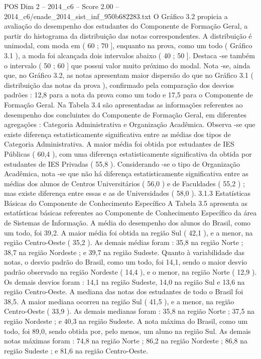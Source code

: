 \begin{textsample}{POS Dim 2 – 2014\_c6 – Score 2.00 – 2014\_c6/enade\_2014\_sist\_inf\_950b682283.txt}
O Gráfico 3.2 propicia a avaliação do desempenho dos estudantes do Componente de Formação Geral, a partir do histograma da distribuição das notas correspondentes.
A distribuição é unimodal, com moda em ( 60 ; 70 ], enquanto na prova, como um todo ( Gráfico 3.1 ), a moda foi alcançada dois intervalos abaixo ( 40 ; 50 ].
Destaca -se também o intervalo ( 50 ; 60 ] que possui valor muito próximo do modal.
Nota -se, ainda que, no Gráfico 3.2, as notas apresentam maior dispersão do que no Gráfico 3.1 ( distribuição das notas da prova ), confirmado pela comparação dos desvios padrões : 12,8 para a nota da prova como um todo e 17,5 para o Componente de Formação Geral.
Na Tabela 3.4 são apresentadas as informações referentes ao desempenho dos concluintes do Componente de Formação Geral, em diferentes agregações : Categoria Administrativa e Organização Acadêmica.
Observa -se que existe diferença estatisticamente significativa entre as médias dos tipos de Categoria Administrativa.
A maior média foi obtida por estudantes de IES Públicas ( 60,4 ), com uma diferença estatisticamente significativa da obtida por estudantes de IES Privadas ( 55,8 ).
Considerando -se o tipo de Organização Acadêmica, nota -se que não há diferença estatisticamente significativa entre as médias dos alunos de Centros Universitários ( 56,0 ) e de Faculdades ( 55,2 ) ; mas existe diferença entre essas e as de Universidades ( 58,0 ). 3.1.3 Estatísticas Básicas do Componente de Conhecimento Específico A Tabela 3.5 apresenta as estatísticas básicas referentes ao Componente de Conhecimento Específico da área de Sistemas de Informação.
A média do desempenho dos alunos do Brasil, como um todo, foi 39,2.
A maior média foi obtida na região Sul ( 42,1 ), e a menor, na região Centro-Oeste ( 35,2 ).
As demais médias foram : 35,8 na região Norte ; 38,7 na região Nordeste ; e 39,7 na região Sudeste.
Quanto à variabilidade das notas, o desvio padrão do Brasil, como um todo, foi 14,1, sendo o maior desvio padrão observado na região Nordeste ( 14,4 ), e o menor, na região Norte ( 12,9 ).
Os demais desvios foram : 14,1 na região Sudeste, 14,0 na região Sul e 13,6 na região Centro-Oeste.
A mediana das notas dos estudantes de todo o Brasil foi 38,5.
A maior mediana ocorreu na região Sul ( 41,5 ), e a menor, na região Centro-Oeste ( 33,9 ).
As demais medianas foram : 35,8 na região Norte ; 37,5 na região Nordeste ; e 40,3 na região Sudeste.
A nota máxima do Brasil, como um todo, foi 89,0, sendo obtida por, pelo menos, um aluno na região Sul.
As demais notas máximas foram : 74,8 na região Norte ; 86,2 na região Nordeste ; 86,8 na região Sudeste ; e 81,6 na região Centro-Oeste.

\end{textsample}
